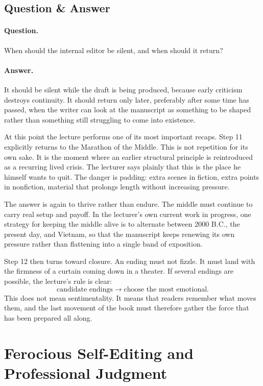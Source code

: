 \subsection{Question \& Answer}

\paragraph{Question.} When should the internal editor be silent, and when should it return?

\paragraph{Answer.} It should be silent while the draft is being produced, because early criticism destroys continuity. It should return only later, preferably after some time has passed, when the writer can look at the manuscript as something to be shaped rather than something still struggling to come into existence.

At this point the lecture performs one of its most important recaps. Step 11 explicitly returns to the Marathon of the Middle. This is not repetition for its own sake. It is the moment where an earlier structural principle is reintroduced as a recurring lived crisis. The lecturer says plainly that this is the place he himself wants to quit. The danger is padding: extra scenes in fiction, extra points in nonfiction, material that prolongs length without increasing pressure.

The answer is again to thrive rather than endure. The middle must continue to carry real setup and payoff. In the lecturer's own current work in progress, one strategy for keeping the middle alive is to alternate between 2000 B.C., the present day, and Vietnam, so that the manuscript keeps renewing its own pressure rather than flattening into a single band of exposition.

Step 12 then turns toward closure. An ending must not fizzle. It must land with the firmness of a curtain coming down in a theater. If several endings are possible, the lecture's rule is clear:
\begin{equation}
\text{candidate endings} \to \text{choose the most emotional}.
\end{equation}
This does not mean sentimentality. It means that readers remember what moves them, and the last movement of the book must therefore gather the force that has been prepared all along.

\section{Ferocious Self-Editing and Professional Judgment}

